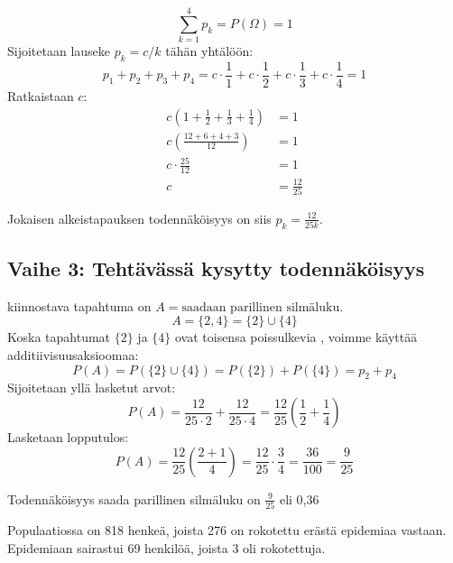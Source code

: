 \documentclass[12pt,a4paper]{article}
\begin{document}
\[
\sum_{k=1}^{4} p_k = P(\Omega) = 1
\]
Sijoitetaan lauseke $p_k = c/k$ tähän yhtälöön:
\[
p_1 + p_2 + p_3 + p_4 = c \cdot \frac{1}{1} + c \cdot \frac{1}{2} + c \cdot \frac{1}{3} + c \cdot \frac{1}{4} = 1
\]
Ratkaistaan $c$:
\begin{align*}
    c \left( 1 + \frac{1}{2} + \frac{1}{3} + \frac{1}{4} \right) &= 1 \\
    c \left( \frac{12+6+4+3}{12} \right) &= 1 \\
    c \cdot \frac{25}{12} &= 1 \\
    c &= \frac{12}{25}
\end{align*}

Jokaisen alkeistapauksen todennäköisyys on siis $p_k = \frac{12}{25k}$.

\pagebreak
\subsection*{Vaihe 3: Tehtävässä kysytty todennäköisyys}
kiinnostava tapahtuma on $A = \text{saadaan parillinen silmäluku}$.
\[
A = \{2, 4\} = \{2\} \cup \{4\}
\]
Koska tapahtumat $\{2\}$ ja $\{4\}$ ovat toisensa poissulkevia ,
voimme käyttää additiivisuusaksioomaa:
\[
P(A) = P(\{2\} \cup \{4\}) = P(\{2\}) + P(\{4\}) = p_2 + p_4
\]
Sijoitetaan yllä lasketut arvot:
\[
P(A) = \frac{12}{25 \cdot 2} + \frac{12}{25 \cdot 4} = \frac{12}{25} \left( \frac{1}{2} + \frac{1}{4} \right)
\]
Lasketaan lopputulos:
\[
P(A) = \frac{12}{25} \left( \frac{2+1}{4} \right) = \frac{12}{25} \cdot \frac{3}{4} = \frac{36}{100} = \frac{9}{25}
\]

Todennäköisyys saada parillinen silmäluku on $\displaystyle \frac{9}{25}$ eli 0,36







\pagebreak
{}
Populaatiossa on 818 henkeä, joista 276 on rokotettu erästä epidemiaa vastaan. Epidemiaan sairastui 69 henkilöä, joista 3 oli rokotettuja.
\end{document}
